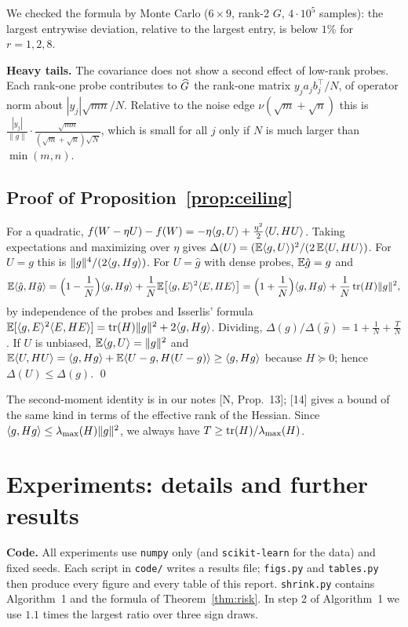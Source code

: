 We checked the formula by Monte Carlo ($6\times9$, rank-2 $G$, $4\cdot10^5$ samples): the largest entrywise deviation, relative to the largest entry, is below $1\%$ for $r=1,2,8$.

\textbf{Heavy tails.} The covariance does not show a second effect of low-rank probes. Each rank-one probe contributes to $\widehat G$ the rank-one matrix $y_ja_jb_j^\top/N$, of operator norm about $|y_j|\sqrt{mn}/N$. Relative to the noise edge $\nu(\sqrt m+\sqrt n)$ this is $\frac{|y_j|}{\|g\|}\cdot\frac{\sqrt{mn}}{(\sqrt m+\sqrt n)\sqrt N}$, which is small for all $j$ only if $N$ is much larger than $\min(m,n)$.

\subsection{Proof of Proposition~\ref{prop:ceiling}}
For a quadratic, $f(W-\eta U)-f(W)=-\eta\langle g,U\rangle+\frac{\eta^2}2\langle U,HU\rangle$. Taking expectations and maximizing over $\eta$ gives $\Delta(U)=(\mathbb{E}\langle g,U\rangle)^2/(2\,\mathbb{E}\langle U,HU\rangle)$. For $U=g$ this is $\|g\|^4/(2\langle g,Hg\rangle)$. For $U=\hat g$ with dense probes, $\mathbb{E}\hat g=g$ and
\[
\mathbb{E}\langle \hat g,H\hat g\rangle=\Big(1-\frac1N\Big)\langle g,Hg\rangle+\frac1N\mathbb{E}\big[\langle g,E\rangle^2\langle E,HE\rangle\big]=\Big(1+\frac1N\Big)\langle g,Hg\rangle+\frac1N\operatorname{tr}(H)\|g\|^2,
\]
by independence of the probes and Isserlis' formula $\mathbb{E}[\langle g,E\rangle^2\langle E,HE\rangle]=\operatorname{tr}(H)\|g\|^2+2\langle g,Hg\rangle$. Dividing, $\Delta(g)/\Delta(\hat g)=1+\frac1N+\frac{T}{N}$. If $U$ is unbiased, $\mathbb{E}\langle g,U\rangle=\|g\|^2$ and $\mathbb{E}\langle U,HU\rangle=\langle g,Hg\rangle+\mathbb{E}\langle U-g,H(U-g)\rangle\ge\langle g,Hg\rangle$ because $H\succeq0$; hence $\Delta(U)\le\Delta(g)$. \qed

The second-moment identity is in our notes [N, Prop.~13]; [14] gives a bound of the same kind in terms of the effective rank of the Hessian. Since $\langle g,Hg\rangle\le\lambda_{\max}(H)\|g\|^2$, we always have $T\ge\operatorname{tr}(H)/\lambda_{\max}(H)$.

\section{Experiments: details and further results}\label{app:exp}
\textbf{Code.} All experiments use \texttt{numpy} only (and \texttt{scikit-learn} for the data) and fixed seeds. Each script in \texttt{code/} writes a results file; \texttt{figs.py} and \texttt{tables.py} then produce every figure and every table of this report. \texttt{shrink.py} contains Algorithm~1 and the formula of Theorem~\ref{thm:risk}. In step 2 of Algorithm~1 we use $1.1$ times the largest ratio over three sign draws.

